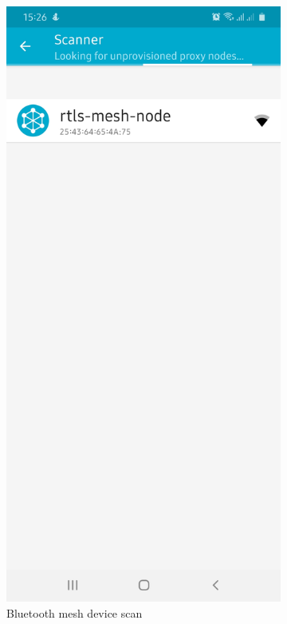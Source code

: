 \documentclass[\main/main.tex]{subfiles}
\begin{document}
\begin{figure}[H]
    \centering
    \begin{subfigure}[b]{0.4\linewidth}
        \centering
        \includegraphics[width=0.7\linewidth]{nRF_Mesh_00.jpg}
        \caption{Bluetooth mesh device scan}
        \label{fig:bluetooth_mesh_device_scan}
    \end{subfigure}
    \begin{subfigure}[b]{0.4\linewidth}
        \centering

\end{subfigure}
\end{figure}
\end{document}
